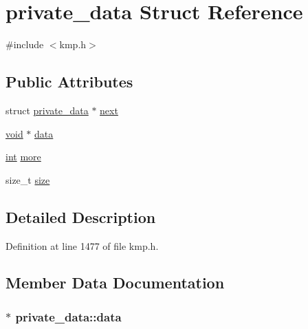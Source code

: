 \hypertarget{structprivate__data}{\section{private\-\_\-data Struct Reference}
\label{structprivate__data}
}


{\ttfamily \#include $<$kmp.\-h$>$}

\subsection*{Public Attributes}
\begin{DoxyCompactItemize}
\item 
struct \hyperlink{structprivate__data}{private\-\_\-data} $\ast$ \hyperlink{structprivate__data_a40405ef18e69262087a4f9430f9cefd2}{next}
\item 
\hyperlink{ittnotify__static_8h_af941d56e55e3c5465135b60c4d6343ed}{void} $\ast$ \hyperlink{structprivate__data_a716a7e5f48fe6428b1697a8a54cc1384}{data}
\item 
\hyperlink{ittnotify__static_8h_a8b8dcd723308a8cb5d84277c7a3fff70}{int} \hyperlink{structprivate__data_aa451b3e8ec1453affabe40b705a8c0e7}{more}
\item 
size\-\_\-t \hyperlink{structprivate__data_ace2d127660a34517f0c1b53a2a2203c1}{size}
\end{DoxyCompactItemize}


\subsection{Detailed Description}


Definition at line 1477 of file kmp.\-h.



\subsection{Member Data Documentation}
\hypertarget{structprivate__data_a716a7e5f48fe6428b1697a8a54cc1384}{
\subsubsection[{data}]{$\ast$ private\-\_\-data\-::data}}\label{structprivate__data_a716a7e5f48fe6428b1697a8a54cc1384}


